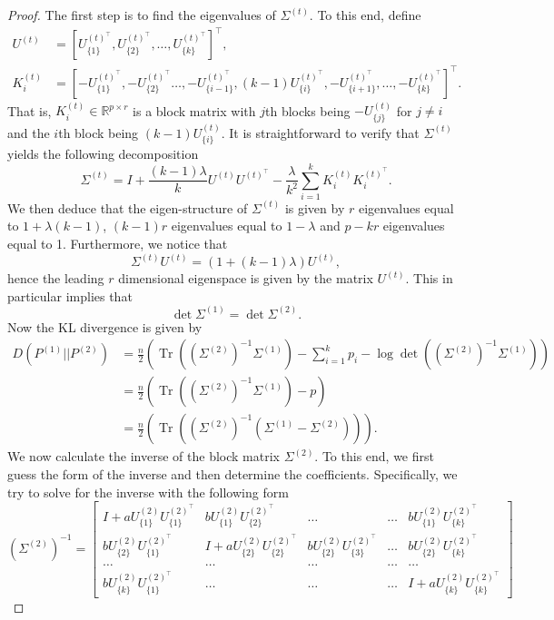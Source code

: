 \documentclass[11pt]{article}
\newcommand{\dc}[1]{\{#1\}} %
\DeclareMathOperator{\Tr}{Tr}
\newcommand{\0}{{\mathbf{0}}}
\begin{document}
\begin{proof}
The first step is to find the eigenvalues of $\Sigma^{(t)}$. To this end, define \begin{align*}
U^{(t)}&=\left[U_{\dc{1}}^{{(t)}^\top}, U_{\dc{2}}^{{(t)}^\top},\dots, U_{\dc{k}}^{{(t)}^\top}\right]^\top,\\ K_i^{(t)} &= \left[-U_{\dc{1}}^{{(t)}^\top}, -U_{\dc{2}}^{{(t)}^\top}\dots, -U_{\dc{i-1}}^{{(t)}^\top}, (k-1)U_{\dc{i}}^{{(t)}^\top}, -U_{\dc{i+1}}^{{(t)}^\top},\dots, -U_{\dc{k}}^{{(t)}^\top}\right]^\top.
\end{align*}
That is, $K_i^{(t)}\in\mathbb{R}^{p\times r}$ is a block matrix with $j$th blocks being $-U_{\dc{j}}^{(t)}$ for $j\neq i$ and the $i$th block being $(k-1)U_{\dc{i}}^{(t)}$.
It is straightforward to verify that $\Sigma^{(t)}$ yields the following decomposition\begin{equation*}
    \Sigma^{(t)} = I +\frac{(k-1)\lambda}{k}U^{(t)}U^{{(t)}^\top}-\frac{\lambda}{k^2}\sum_{i=1}^k K_i^{(t)}K_i^{{(t)}^\top}.
\end{equation*}
We then deduce that the eigen-structure of $\Sigma^{(t)}$ is given by $r$ eigenvalues equal to $1+\lambda(k-1)$, $(k-1)r$ eigenvalues equal to $1-\lambda$ and $p-kr$ eigenvalues equal to 1. Furthermore, we notice that\begin{equation*}
    \Sigma^{(t)}U^{(t)} = (1+(k-1)\lambda) U^{(t)},
\end{equation*}
hence the leading $r$ dimensional eigenspace is given by the matrix $U^{(t)}$. This in particular implies that\begin{equation*}
    \det \Sigma^{(1)} =  \det \Sigma^{(2)}.
\end{equation*}
Now the KL divergence is given by\begin{align*}
    D(P^{(1)}||P^{(2)}) &= \frac{n}{2}\left(\Tr\left( (\Sigma^{(2)})^{-1} \Sigma^{(1)}\right)-\sum_{i=1}^k p_i-\log\det\left((\Sigma^{(2)})^{-1} \Sigma^{(1)}\right)\right)\\
    &= \frac{n}{2} \left(\Tr\left( (\Sigma^{(2)})^{-1} \Sigma^{(1)}\right) - p\right)\\
    &= \frac{n}{2} \left(\Tr\left( (\Sigma^{(2)})^{-1} \left(\Sigma^{(1)} - \Sigma^{(2)}\right)\right)\right).
\end{align*}
We now calculate the inverse of the block matrix $\Sigma^{(2)}$. To this end, we first guess the form of the inverse and then determine the coefficients. Specifically, we try to solve for the inverse with the following form
\begin{equation*}
    (\Sigma^{(2)})^{-1} = \begin{bmatrix}
I + aU_{\dc{1}}^{(2)}U_{\dc{1}}^{{(2)}^\top} & bU_{\dc{1}}^{(2)}U_{\dc{2}}^{{(2)}^\top} & \dots &\dots & bU_{\dc{1}}^{(2)}U_{\dc{k}}^{{(2)}^\top}\\
bU_{\dc{2}}^{(2)}U_{\dc{1}}^{{(2)}^\top} & I + aU_{\dc{2}}^{(2)}U_{\dc{2}}^{{(2)}^\top}&bU_{\dc{2}}^{(2)}U_{\dc{3}}^{{(2)}^\top} &\dots &bU_{\dc{2}}^{(2)}U_{\dc{k}}^{{(2)}^\top} \\
\dots&\dots&\dots&\dots&\dots\\
bU_{\dc{k}}^{(2)}U_{\dc{1}}^{{(2)}^\top}&\dots&\dots&\dots& I + aU_{\dc{k}}^{(2)}U_{\dc{k}}^{{(2)}^\top}


\end{bmatrix}
\end{equation*}
\end{proof}
\end{document}
